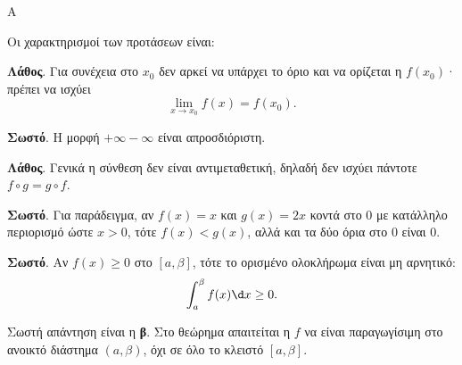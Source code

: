 \begin{thema}{Α}
\begin{erwthma}
\item {}

\item {}

\item {}

\item Οι χαρακτηρισμοί των προτάσεων είναι:
\begin{alist}
\item \textbf{Λάθος}. Για συνέχεια στο $x_0$ δεν αρκεί να υπάρχει το όριο και να ορίζεται η $f(x_0)$· πρέπει να ισχύει
\[ \lim_{x\to x_0}f(x)=f(x_0). \]
\item \textbf{Σωστό}. Η μορφή $+\infty-\infty$ είναι απροσδιόριστη.
\item \textbf{Λάθος}. Γενικά η σύνθεση δεν είναι αντιμεταθετική, δηλαδή δεν ισχύει πάντοτε $f\circ g=g\circ f$.
\item \textbf{Σωστό}. Για παράδειγμα, αν $f(x)=x$ και $g(x)=2x$ κοντά στο $0$ με κατάλληλο περιορισμό ώστε $x>0$, τότε $f(x)<g(x)$, αλλά και τα δύο όρια στο $0$ είναι $0$.
\item \textbf{Σωστό}. Αν $f(x)\geq0$ στο $[a,\beta]$, τότε το ορισμένο ολοκλήρωμα είναι μη αρνητικό:
\[ \dint_a^\beta f(x)\d x\geq0. \]
\end{alist}

\item Σωστή απάντηση είναι η \textbf{β}. Στο θεώρημα  απαιτείται η $f$ να είναι παραγωγίσιμη στο ανοικτό διάστημα $(a,\beta)$, όχι σε όλο το κλειστό $[a,\beta]$.
\end{erwthma}
\end{thema}

